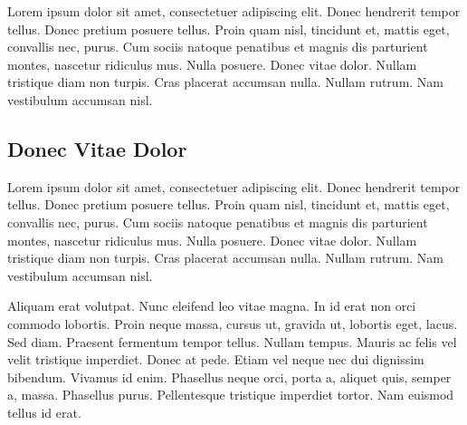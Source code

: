 Lorem ipsum dolor sit amet, consectetuer adipiscing elit. Donec
hendrerit tempor tellus. Donec pretium posuere tellus. Proin quam nisl,
tincidunt et, mattis eget, convallis nec, purus. Cum sociis natoque
penatibus et magnis dis parturient montes, nascetur ridiculus mus. Nulla
posuere. Donec vitae dolor. Nullam tristique diam non turpis. Cras
placerat accumsan nulla. Nullam rutrum. Nam vestibulum accumsan nisl.

%

\subsection{Donec Vitae Dolor}
\label{sec:example-chapter:donec-vitae-dolor}

%
Lorem ipsum dolor sit amet, consectetuer adipiscing elit. Donec
hendrerit tempor tellus. Donec pretium posuere tellus. Proin quam nisl,
tincidunt et, mattis eget, convallis nec, purus. Cum sociis natoque
penatibus et magnis dis parturient montes, nascetur ridiculus mus. Nulla
posuere. Donec vitae dolor. Nullam tristique diam non turpis. Cras
placerat accumsan nulla. Nullam rutrum. Nam vestibulum accumsan nisl.

%
Aliquam erat volutpat. Nunc eleifend leo vitae magna. In id erat non
orci commodo lobortis. Proin neque massa, cursus ut, gravida ut,
lobortis eget, lacus. Sed diam. Praesent fermentum tempor tellus. Nullam
tempus. Mauris ac felis vel velit tristique imperdiet. Donec at
pede. Etiam vel neque nec dui dignissim bibendum. Vivamus id
enim. Phasellus neque orci, porta a, aliquet quis, semper a,
massa. Phasellus purus. Pellentesque tristique imperdiet tortor. Nam
euismod tellus id erat.

